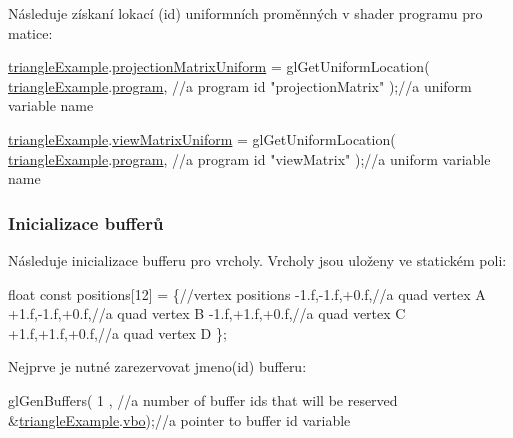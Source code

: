 Následuje získaní lokací (id) uniformních proměnných v shader programu pro matice\-: 
\begin{DoxyCodeInclude}
  \hyperlink{triangleExample_8c_af82b723635ac0c90962571915a1b1163}{triangleExample}.\hyperlink{structTriangleExampleVariables_a0215b92b36815394d6a4c8b5e3baa27a}{projectionMatrixUniform} = glGetUniformLocation(
      \hyperlink{triangleExample_8c_af82b723635ac0c90962571915a1b1163}{triangleExample}.\hyperlink{structTriangleExampleVariables_abc287e489a25d4e3c4ad1899d183881d}{program}, \textcolor{comment}{//a program id}
      \textcolor{stringliteral}{"projectionMatrix"}     );\textcolor{comment}{//a uniform variable name}

  \hyperlink{triangleExample_8c_af82b723635ac0c90962571915a1b1163}{triangleExample}.\hyperlink{structTriangleExampleVariables_a94cf55d21d35fb4d0f85c1d7a49e6474}{viewMatrixUniform} = glGetUniformLocation(
      \hyperlink{triangleExample_8c_af82b723635ac0c90962571915a1b1163}{triangleExample}.\hyperlink{structTriangleExampleVariables_abc287e489a25d4e3c4ad1899d183881d}{program}, \textcolor{comment}{//a program id}
      \textcolor{stringliteral}{"viewMatrix"}           );\textcolor{comment}{//a uniform variable name}
\end{DoxyCodeInclude}
\hypertarget{triangleExample.c_Buffers}{}\subsubsection{Inicializace bufferů}\label{triangleExample.c_Buffers}
Následuje inicializace bufferu pro vrcholy. Vrcholy jsou uloženy ve statickém poli\-: 
\begin{DoxyCodeInclude}
  \textcolor{keywordtype}{float} \textcolor{keyword}{const} positions[12] = \{\textcolor{comment}{//vertex positions}
    -1.f,-1.f,+0.f,\textcolor{comment}{//a quad vertex A}
    +1.f,-1.f,+0.f,\textcolor{comment}{//a quad vertex B}
    -1.f,+1.f,+0.f,\textcolor{comment}{//a quad vertex C}
    +1.f,+1.f,+0.f,\textcolor{comment}{//a quad vertex D}
  \};
\end{DoxyCodeInclude}
Nejprve je nutné zarezervovat jmeno(id) bufferu\-: 
\begin{DoxyCodeInclude}
  glGenBuffers(
      1                   , \textcolor{comment}{//a number of buffer ids that will be reserved}
      &\hyperlink{triangleExample_8c_af82b723635ac0c90962571915a1b1163}{triangleExample}.\hyperlink{structTriangleExampleVariables_af3b747228ed4a26fffca56a69838ecae}{vbo});\textcolor{comment}{//a pointer to buffer id variable}
\end{DoxyCodeInclude}
